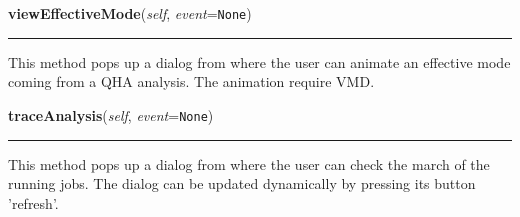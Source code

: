     \label{nMOLDYN:GUI:MainDialog:MainDialog:viewEffectiveMode}

    \vspace{0.5ex}

\hspace{.8\funcindent}\begin{boxedminipage}{\funcwidth}

    \raggedright \textbf{viewEffectiveMode}(\textit{self}, \textit{event}={\tt None})

    \vspace{-1.5ex}

    \rule{\textwidth}{0.5\fboxrule}
\setlength{\parskip}{2ex}
    This method pops up a dialog from where the user can animate an 
    effective mode coming from a QHA analysis. The animation require VMD.

\setlength{\parskip}{1ex}
    \end{boxedminipage}

    \label{nMOLDYN:GUI:MainDialog:MainDialog:traceAnalysis}

    \vspace{0.5ex}

\hspace{.8\funcindent}\begin{boxedminipage}{\funcwidth}

    \raggedright \textbf{traceAnalysis}(\textit{self}, \textit{event}={\tt None})

    \vspace{-1.5ex}

    \rule{\textwidth}{0.5\fboxrule}
\setlength{\parskip}{2ex}
    This method pops up a dialog from where the user can check the march of
    the running jobs. The dialog can be updated dynamically by pressing its
    button 'refresh'.

\setlength{\parskip}{1ex}
    \end{boxedminipage}

    \label{nMOLDYN:GUI:MainDialog:MainDialog:analysisBenchmark}

